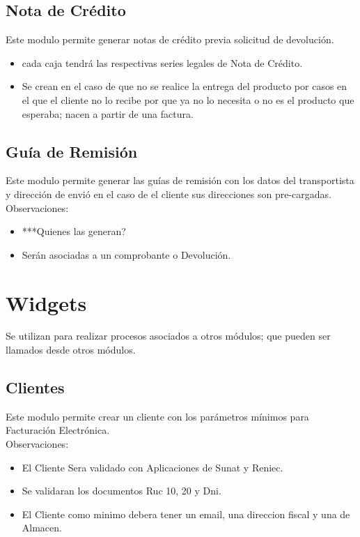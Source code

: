 \documentclass[pdftex,12pt,oneside,a4paper,spanish, english, brazil]{abntex2}
\begin{document}
\begin{sloppypar}
              \subsection{Nota de Crédito}
              Este modulo permite generar notas de crédito previa solicitud de devolución.
              \begin{itemize}
              	\item cada caja tendrá las respectivas series legales de Nota de Crédito.
              	\item Se crean en el caso de que no se realice la entrega del producto por casos en el que el cliente no lo recibe por que ya no lo necesita o no es el producto que esperaba; nacen a partir de una factura.
              \end{itemize}
              \subsection{Guía de Remisión}
              Este modulo permite generar las guías de remisión con los datos del transportista y dirección de envió en el caso de el cliente sus direcciones son pre-cargadas.\\
              Observaciones:
              \begin{itemize}
              	\item ***Quienes las generan?
              	\item Serán asociadas a un comprobante o Devolución.
              \end{itemize}
          \section{Widgets}
          Se utilizan para realizar procesos asociados a otros módulos; que pueden ser llamados desde otros módulos.
          \subsection{Clientes}
          Este modulo permite crear un cliente con los parámetros mínimos para Facturación Electrónica.\\
          Observaciones:
          \begin{itemize}
          	\item El Cliente Sera validado con Aplicaciones de Sunat y Reniec.
          	\item Se validaran los documentos Ruc 10, 20 y Dni.
          	\item El Cliente como minimo debera tener un email, una direccion fiscal y una de Almacen.
          \end{itemize}

\end{sloppypar}
\end{document}

